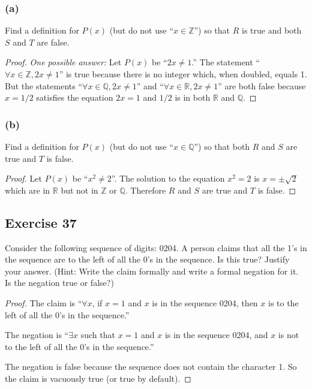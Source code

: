 \documentclass[14pt]{extarticle}
\newcommand{\R}{\mathbb{R}}
\newcommand{\Z}{\mathbb{Z}}
\newcommand{\Q}{\mathbb{Q}}
\newcommand{\fa}{\forall}
\newcommand{\te}{\exists}
\begin{document}
\subsubsection{(a)}
Find a definition for $P(x)$ (but do not use “$x \in \Z$”) so that $R$ is true and both $S$ and $T$ are false.

\begin{proof}
    {\it One possible answer:} Let $P(x)$ be “$2x \neq 1$.” The
    statement “$\fa x \in \Z, 2x \neq 1$” is true because there is no integer which, when doubled, equals 1. But the statements “$\fa x \in \Q, 2x \neq 1$” and “$\fa x \in \R, 2x \neq 1$” are both false because $x = 1/2$ satisfies the equation $2x = 1$ and $1/2$ is in both $\R$ and $\Q$.
\end{proof}

\subsubsection{(b)}
Find a definition for $P(x)$ (but do not use “$x \in \Q$”) so that both $R$ and $S$ are true and $T$ is false.

\begin{proof}
    Let $P(x)$ be ``$x^2 \neq 2$''. The solution to the equation $x^2 = 2$ is $x = \pm \sqrt{2}$ which are in $\R$ but not in $\Z$ or $\Q$. Therefore $R$ and $S$ are true and $T$ is false.
\end{proof}

\subsection{Exercise 37}
Consider the following sequence of digits: 0204. A person claims that all the 1’s in the sequence are to the left of all the 0’s in the sequence. Is this true? Justify your answer. (Hint: Write the claim formally and write a formal negation for it. Is the negation true or false?)

\begin{proof}
    The claim is “$\fa x$, if $x = 1$ and $x$ is in the sequence 0204, then $x$ is to the left of all the 0’s in the sequence.”

    The negation is “$\te x$ such that $x = 1$ and $x$ is in the sequence 0204, and $x$ is not to the left of all the 0’s in the sequence.”

    The negation is false because the sequence does not contain the character 1. So the claim is vacuously true (or true by default).
\end{proof}
\end{document}
